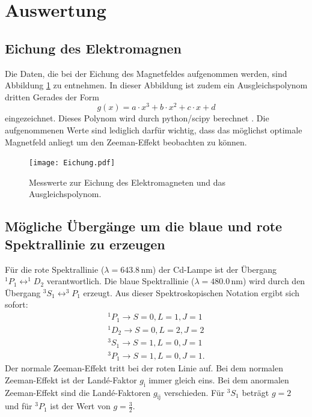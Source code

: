 \section{Auswertung}
\label{sec:Auswertung}

\subsection{Eichung des Elektromagnen}
\label{sec:Eichung}
Die Daten, die bei der Eichung des Magnetfeldes aufgenommen werden, sind
Abbildung \ref{fig:eichung} zu entnehmen. In dieser Abbildung ist zudem ein
Ausgleichspolynom dritten Gerades der Form
\begin{equation*}
  g(x) = a\cdot x^3 + b\cdot x^2 + c\cdot x + d
\end{equation*}
eingezeichnet. Dieses Polynom wird durch python/scipy berechnet \cite{scipy}.
Die aufgenommenen Werte sind lediglich darfür wichtig, dass das
möglichst optimale Magnetfeld anliegt um den Zeeman-Effekt beobachten zu können.
\begin{figure}
  \centering
  \texttt{[image: Eichung.pdf]}
  \caption{Messwerte zur Eichung des Elektromagneten und das Ausgleichspolynom.}
  \label{fig:eichung}
\end{figure}

\subsection{Mögliche Übergänge um die blaue und rote Spektrallinie zu erzeugen}
\label{sec:Uebergaenge}
Für die rote Spektrallinie ($\lambda = 643.8\, \si{\nano\meter}$) der Cd-Lampe ist der Übergang
${^{1}P_\text{1} \leftrightarrow ^{1}D_\text{2}}$ verantwortlich. Die blaue
Spektrallinie ($\lambda = 480.0 \,\si{\nano\meter}$) wird durch den Übergang
${^{3}S_\text{1} \leftrightarrow ^{3}P_\text{1}}$ erzeugt. Aus dieser
Spektroskopischen Notation ergibt sich sofort:
\begin{align*}
  ^{1}P_\text{1} \rightarrow S=0, L=1, J=1\\
  ^{1}D_\text{2} \rightarrow S=0, L=2, J=2\\
  ^{3}S_\text{1} \rightarrow S=1, L=0, J=1\\
  ^{3}P_\text{1} \rightarrow S=1, L=0, J=1 .
\end{align*}
Der normale Zeeman-Effekt tritt bei der roten Linie auf. Bei dem normalen Zeeman-Effekt
ist der Landé-Faktor $g_\text{i}$ immer gleich eins. Bei dem anormalen Zeeman-Effekt
sind die Landé-Faktoren $g_\text{ij}$ verschieden. Für $^{3}S_\text{1}$ beträgt
$g = 2$ und für $^{3}P_\text{1}$ ist der Wert von $g = \frac{3}{2}$.

